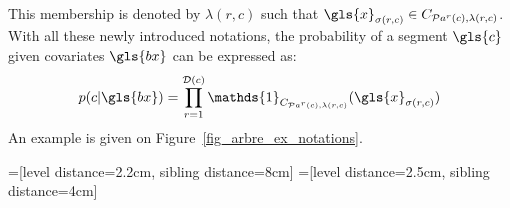 This membership is denoted by $\lambda(r,c)$ such that $\gls{x}_{\sigma(r,c)} \in C_{\mathcal{P}a^r(c),\lambda(r,c)}$.
With all these newly introduced notations, the probability of a segment $\gls{c}$ given covariates $\gls{bx}$ can be expressed as:
\begin{equation} \label{eq:tree}
p( c | \gls{bx}) = \prod_{r = 1}^{\mathcal{D}(c)} \mathds{1}_{C_{\mathcal{P}a^r(c),\lambda(r,c)}} (\gls{x}_{\sigma(r,c)})
\end{equation}
An example is given on Figure~\ref{fig_arbre_ex_notations}.

=[level distance=2.2cm, sibling distance=8cm]
=[level distance=2.5cm, sibling distance=4cm]


